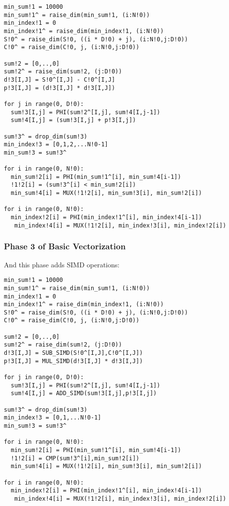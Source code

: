 {\small
\begin{verbatim}
min_sum!1 = 10000
min_sum!1^ = raise_dim(min_sum!1, (i:N!0))
min_index!1 = 0
min_index!1^ = raise_dim(min_index!1, (i:N!0))
S!0^ = raise_dim(S!0, ((i * D!0) + j), (i:N!0,j:D!0))
C!0^ = raise_dim(C!0, j, (i:N!0,j:D!0))

sum!2 = [0,..,0]
sum!2^ = raise_dim(sum!2, (j:D!0))
d!3[I,J] = S!0^[I,J] - C!0^[I,J]
p!3[I,J] = (d!3[I,J] * d!3[I,J])

for j in range(0, D!0):
  sum!3[I,j] = PHI(sum!2^[I,j], sum!4[I,j-1])       
  sum!4[I,j] = (sum!3[I,j] + p!3[I,j])

sum!3^ = drop_dim(sum!3)     
min_index!3 = [0,1,2,...N!0-1]   
min_sum!3 = sum!3^

for i in range(0, N!0):
  min_sum!2[i] = PHI(min_sum!1^[i], min_sum!4[i-1]) 
  !1!2[i] = (sum!3^[i] < min_sum!2[i])
  min_sum!4[i] = MUX(!1!2[i], min_sum!3[i], min_sum!2[i])
    
for i in range(0, N!0):
  min_index!2[i] = PHI(min_index!1^[i], min_index!4[i-1])  
   min_index!4[i] = MUX(!1!2[i], min_index!3[i], min_index!2[i])
\end{verbatim}
}

\subsubsection{Phase 3 of Basic Vectorization}

And this phase adds SIMD operations:

{\small
\begin{verbatim}
min_sum!1 = 10000
min_sum!1^ = raise_dim(min_sum!1, (i:N!0))
min_index!1 = 0
min_index!1^ = raise_dim(min_index!1, (i:N!0))
S!0^ = raise_dim(S!0, ((i * D!0) + j), (i:N!0,j:D!0))
C!0^ = raise_dim(C!0, j, (i:N!0,j:D!0))

sum!2 = [0,..,0]
sum!2^ = raise_dim(sum!2, (j:D!0))
d!3[I,J] = SUB_SIMD(S!0^[I,J],C!0^[I,J])
p!3[I,J] = MUL_SIMD(d!3[I,J] * d!3[I,J])

for j in range(0, D!0):
  sum!3[I,j] = PHI(sum!2^[I,j], sum!4[I,j-1])       
  sum!4[I,j] = ADD_SIMD(sum!3[I,j],p!3[I,j])

sum!3^ = drop_dim(sum!3)     
min_index!3 = [0,1,...N!0-1]   
min_sum!3 = sum!3^

for i in range(0, N!0):
  min_sum!2[i] = PHI(min_sum!1^[i], min_sum!4[i-1]) 
  !1!2[i] = CMP(sum!3^[i],min_sum!2[i])
  min_sum!4[i] = MUX(!1!2[i], min_sum!3[i], min_sum!2[i])
    
for i in range(0, N!0):
  min_index!2[i] = PHI(min_index!1^[i], min_index!4[i-1])  
   min_index!4[i] = MUX(!1!2[i], min_index!3[i], min_index!2[i])
\end{verbatim}
}

